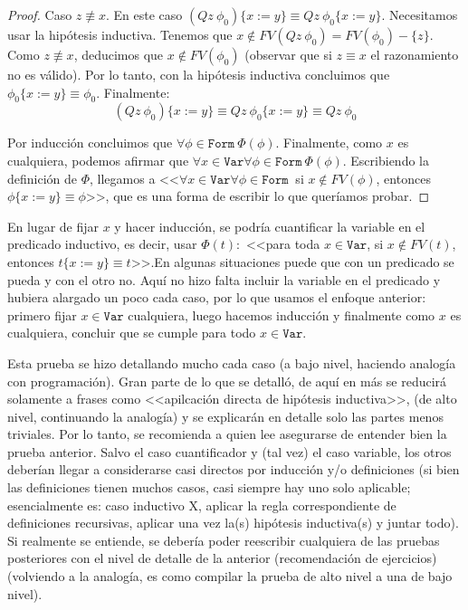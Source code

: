 \documentclass[a4paper, 12pt]{report}
\theoremstyle{definition}
\begin{document}
\begin{proof}
	Caso $z\not\equiv x$. En este caso $(Qz~\phi_0)\{x:=y\}\equiv Qz~\phi_0\{x:=y\}$. Necesitamos usar la hipótesis inductiva. Tenemos que $x\not\in FV(Qz~\phi_0)=FV(\phi_0)-\{z\}$. Como $z\not\equiv x$, deducimos que $x\not\in FV(\phi_0)$ (observar que si $z\equiv x$ el razonamiento no es válido). Por lo tanto, con la hipótesis inductiva concluimos que $\phi_0\{x:=y\}\equiv\phi_0$. Finalmente:
	$$ (Qz~\phi_0)\{x:=y\}\equiv Qz~\phi_0\{x:=y\}\equiv Qz~\phi_0
	$$
	
	Por inducción concluimos que $\forall \phi\in\mathtt{Form}~\Phi(\phi)$. Finalmente, como $x$ es cualquiera, podemos afirmar que $\forall x\in\mathtt{Var}\forall \phi\in\mathtt{Form}~\Phi(\phi)$. Escribiendo la definición de $\Phi$, llegamos a <<$\forall x\in\mathtt{Var}\forall \phi\in\mathtt{Form}~$ si $x\not\in FV(\phi)$, entonces $\phi\{x:=y\}\equiv\phi$>>, que es una forma de escribir lo que queríamos probar.
\end{proof}
En lugar de fijar $x$ y hacer inducción, se podría cuantificar la variable en el predicado inductivo, es decir, usar $\Phi(t):$ <<para toda $x\in\mathtt{Var}$, si $x\not\in FV(t)$, entonces $t\{x:=y\}\equiv t$>>.\linebreak En algunas situaciones puede que con un predicado se pueda y con el otro no. Aquí no hizo falta incluir la variable en el predicado y hubiera alargado un poco cada caso, por lo que usamos el enfoque anterior: primero fijar $x\in\mathtt{Var}$ cualquiera, luego hacemos inducción y finalmente como $x$ es cualquiera, concluir que se cumple para todo $x\in\mathtt{Var}$.

Esta prueba se hizo detallando mucho cada caso (a bajo nivel, haciendo analogía con programación). Gran parte de lo que se detalló, de aquí en más se reducirá solamente a frases como <<apilcación directa de hipótesis inductiva>>,  (de alto nivel, continuando la analogía) y se explicarán en detalle solo las partes menos triviales. Por lo tanto, se recomienda a quien lee asegurarse de entender bien la prueba anterior. Salvo el caso cuantificador y (tal vez) el caso variable, los otros deberían llegar a considerarse casi directos por inducción y/o definiciones (si bien las definiciones tienen muchos casos, casi siempre hay uno solo aplicable; esencialmente es: caso inductivo X, aplicar la regla correspondiente de definiciones recursivas, aplicar una vez la(s) hipótesis inductiva(s) y juntar todo). Si realmente se entiende, se debería poder reescribir cualquiera de las pruebas posteriores con el nivel de detalle de la anterior (recomendación de ejercicios) (volviendo a la analogía, es como compilar la prueba de alto nivel a una de bajo nivel).
\end{document}
